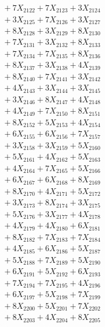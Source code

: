 \documentclass[a4paper,10pt]{article}
\begin{document}
{\begin{align}
&\;  + 7 X_{2122} + 7 X_{2123} + 3 X_{2124} \\[0.3ex]
&\;  + 3 X_{2125} + 7 X_{2126} + 3 X_{2127} \\[0.3ex]
&\;  + 8 X_{2128} + 3 X_{2129} + 8 X_{2130} \\[0.3ex]
&\;  + 7 X_{2131} + 3 X_{2132} + 8 X_{2133} \\[0.3ex]
&\;  + 7 X_{2134} + 7 X_{2135} + 8 X_{2136} \\[0.3ex]
&\;  + 8 X_{2137} + 3 X_{2138} + 4 X_{2139} \\[0.5ex]\allowbreak
&\;  + 8 X_{2140} + 7 X_{2141} + 3 X_{2142} \\[0.3ex]
&\;  + 4 X_{2143} + 3 X_{2144} + 3 X_{2145} \\[0.3ex]
&\;  + 3 X_{2146} + 8 X_{2147} + 4 X_{2148} \\[0.3ex]
&\;  + 4 X_{2149} + 7 X_{2150} + 8 X_{2151} \\[0.3ex]
&\;  + 8 X_{2152} + 5 X_{2153} + 4 X_{2154} \\[0.3ex]
&\;  + 6 X_{2155} + 6 X_{2156} + 7 X_{2157} \\[0.3ex]
&\;  + 3 X_{2158} + 3 X_{2159} + 5 X_{2160} \\[0.3ex]
&\;  + 5 X_{2161} + 4 X_{2162} + 5 X_{2163} \\[0.3ex]
&\;  + 4 X_{2164} + 7 X_{2165} + 5 X_{2166} \\[0.3ex]
&\;  + 6 X_{2167} + 6 X_{2168} + 8 X_{2169} \\[0.5ex]\allowbreak
&\;  + 8 X_{2170} + 4 X_{2171} + 5 X_{2172} \\[0.3ex]
&\;  + 3 X_{2173} + 8 X_{2174} + 3 X_{2175} \\[0.3ex]
&\;  + 5 X_{2176} + 3 X_{2177} + 4 X_{2178} \\[0.3ex]
&\;  + 4 X_{2179} + 4 X_{2180} + 6 X_{2181} \\[0.3ex]
&\;  + 8 X_{2182} + 7 X_{2183} + 7 X_{2184} \\[0.3ex]
&\;  + 4 X_{2185} + 6 X_{2186} + 5 X_{2187} \\[0.3ex]
&\;  + 5 X_{2188} + 7 X_{2189} + 5 X_{2190} \\[0.3ex]
&\;  + 6 X_{2191} + 5 X_{2192} + 6 X_{2193} \\[0.3ex]
&\;  + 7 X_{2194} + 7 X_{2195} + 4 X_{2196} \\[0.3ex]
&\;  + 6 X_{2197} + 5 X_{2198} + 7 X_{2199} \\[0.5ex]\allowbreak
&\;  + 8 X_{2200} + 5 X_{2201} + 7 X_{2202} \\[0.3ex]
&\;  + 8 X_{2203} + 4 X_{2204} + 8 X_{2205} \\[0.3ex]

\end{align}}
\end{document}
